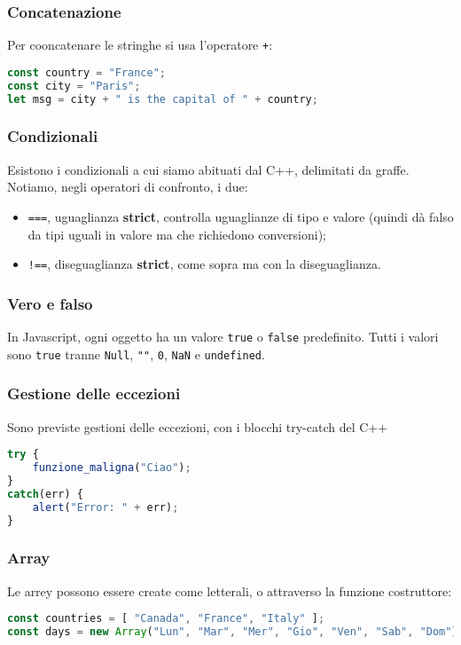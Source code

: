 \documentclass[a4paper,11pt]{article}
\begin{document}
\subsubsection{Concatenazione}
Per cooncatenare le stringhe si usa l'operatore \lstinline|+|:
\begin{lstlisting}[language=javascript, style=codestyle]	
const country = "France";
const city = "Paris";
let msg = city + " is the capital of " + country;
\end{lstlisting}

\subsubsection{Condizionali}
Esistono i condizionali a cui siamo abituati dal C++, delimitati da graffe.
Notiamo, negli operatori di confronto, i due:
\begin{itemize}
	\item \lstinline|===|, uguaglianza \textbf{strict}, controlla uguaglianze di tipo e valore (quindi dà falso da tipi uguali in valore ma che richiedono conversioni);
	\item \lstinline|!==|, diseguaglianza \textbf{strict}, come sopra ma con la diseguaglianza.
\end{itemize}

\subsubsection{Vero e falso}
In Javascript, ogni oggetto ha un valore \lstinline|true| o \lstinline|false| predefinito.
Tutti i valori sono \lstinline|true| tranne \lstinline|Null|, \lstinline|""|, \lstinline|0|, \lstinline|NaN| e \lstinline|undefined|.

\subsubsection{Gestione delle eccezioni}
Sono previste gestioni delle eccezioni, con i blocchi try-catch del C++
\begin{lstlisting}[language=javascript, style=codestyle]	
try {
	funzione_maligna("Ciao");
}
catch(err) {
	alert("Error: " + err);
}
\end{lstlisting}

\subsubsection{Array}
Le arrey possono essere create come letterali, o attraverso la funzione costruttore:
\begin{lstlisting}[language=javascript, style=codestyle]	
const countries = [ "Canada", "France", "Italy" ];
const days = new Array("Lun", "Mar", "Mer", "Gio", "Ven", "Sab", "Dom");
\end{lstlisting}
\end{document}
